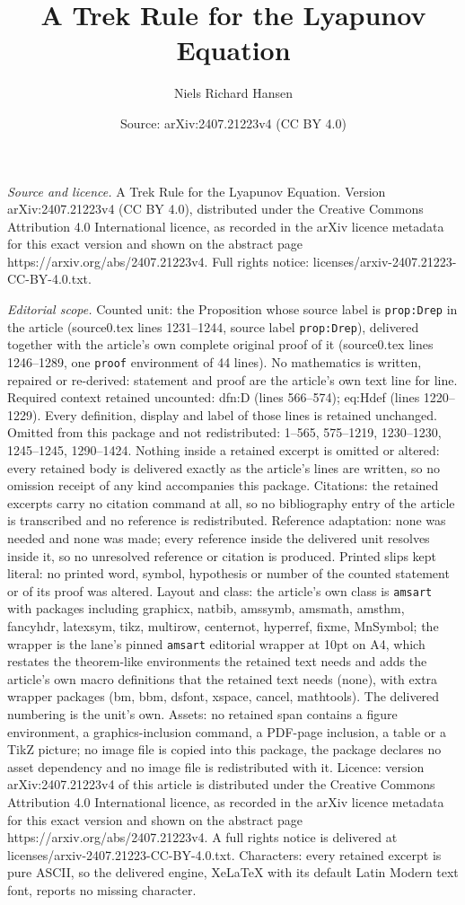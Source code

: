 \documentclass[10pt,a4paper]{amsart}
\title[A Trek Rule for the Lyapunov Equation]{A Trek Rule for the Lyapunov Equation}
\author{Niels Richard Hansen}
\date{Source: arXiv:2407.21223v4 (CC BY 4.0)}
\begin{document}
\maketitle

\noindent\emph{Source and licence.} A Trek Rule for the Lyapunov Equation. Version arXiv:2407.21223v4 (CC BY 4.0), distributed under the Creative Commons Attribution 4.0 International licence, as recorded in the arXiv licence metadata for this exact version and shown on the abstract page https://arxiv.org/abs/2407.21223v4. Full rights notice: licenses/arxiv-2407.21223-CC-BY-4.0.txt.\par\smallskip

\noindent\textit{Editorial scope.} Counted unit: the Proposition whose source label is \texttt{prop:Drep} in the article (source0.tex lines 1231--1244, source label \texttt{prop:Drep}), delivered together with the article's own complete original proof of it (source0.tex lines 1246--1289, one \texttt{proof} environment of 44 lines). No mathematics is written, repaired or re-derived: statement and proof are the article's own text line for line. Required context retained uncounted: dfn:D (lines 566--574); eq:Hdef (lines 1220--1229). Every definition, display and label of those lines is retained unchanged. Omitted from this package and not redistributed: 1--565, 575--1219, 1230--1230, 1245--1245, 1290--1424. Nothing inside a retained excerpt is omitted or altered: every retained body is delivered exactly as the article's lines are written, so no omission receipt of any kind accompanies this package. Citations: the retained excerpts carry no citation command at all, so no bibliography entry of the article is transcribed and no reference is redistributed. Reference adaptation: none was needed and none was made; every reference inside the delivered unit resolves inside it, so no unresolved reference or citation is produced. Printed slips kept literal: no printed word, symbol, hypothesis or number of the counted statement or of its proof was altered. Layout and class: the article's own class is \texttt{amsart} with packages including graphicx, natbib, amssymb, amsmath, amsthm, fancyhdr, latexsym, tikz, multirow, centernot, hyperref, fixme, MnSymbol; the wrapper is the lane's pinned \texttt{amsart} editorial wrapper at 10pt on A4, which restates the theorem-like environments the retained text needs and adds the article's own macro definitions that the retained text needs (none), with extra wrapper packages (bm, bbm, dsfont, xspace, cancel, mathtools). The delivered numbering is the unit's own. Assets: no retained span contains a figure environment, a graphics-inclusion command, a PDF-page inclusion, a table or a TikZ picture; no image file is copied into this package, the package declares no asset dependency and no image file is redistributed with it. Licence: version arXiv:2407.21223v4 of this article is distributed under the Creative Commons Attribution 4.0 International licence, as recorded in the arXiv licence metadata for this exact version and shown on the abstract page https://arxiv.org/abs/2407.21223v4. A full rights notice is delivered at licenses/arxiv-2407.21223-CC-BY-4.0.txt. Characters: every retained excerpt is pure ASCII, so the delivered engine, XeLaTeX with its default Latin Modern text font, reports no missing character.
\end{document}

